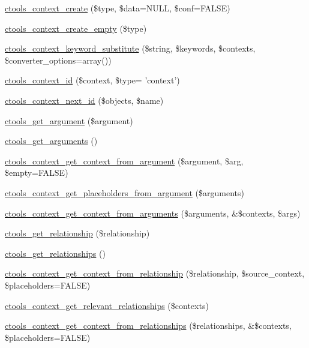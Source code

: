 \begin{DoxyCompactItemize}
\item 
\hyperlink{context_8inc_aaaf945e810dc48a1cf4643c8cb3844d9}{ctools\_\-context\_\-create} (\$type, \$data=NULL, \$conf=FALSE)
\item 
\hyperlink{context_8inc_ad8ae1df3fc34258a1b45a476782235c7}{ctools\_\-context\_\-create\_\-empty} (\$type)
\item 
\hyperlink{context_8inc_a713ff6a51980f56ba1d148ef7c3640ab}{ctools\_\-context\_\-keyword\_\-substitute} (\$string, \$keywords, \$contexts, \$converter\_\-options=array())
\item 
\hyperlink{context_8inc_aa9c13b6311b3d3a54e95a440bb3b0002}{ctools\_\-context\_\-id} (\$context, \$type= 'context')
\item 
\hyperlink{context_8inc_aa979b980941194295a45cd5000ff12ae}{ctools\_\-context\_\-next\_\-id} (\$objects, \$name)
\item 
\hyperlink{context_8inc_a008e36a5cbc918184c3227c92543cbac}{ctools\_\-get\_\-argument} (\$argument)
\item 
\hyperlink{context_8inc_afbc5e7faf33cdfa3148b17bf51934867}{ctools\_\-get\_\-arguments} ()
\item 
\hyperlink{context_8inc_a9b5a82287320cccb2cdfc67e9639ae59}{ctools\_\-context\_\-get\_\-context\_\-from\_\-argument} (\$argument, \$arg, \$empty=FALSE)
\item 
\hyperlink{context_8inc_a10a7b9e1be12405cb9de377762c7372b}{ctools\_\-context\_\-get\_\-placeholders\_\-from\_\-argument} (\$arguments)
\item 
\hyperlink{context_8inc_aebcef7cae5df2ee7b36493cce24cfd8b}{ctools\_\-context\_\-get\_\-context\_\-from\_\-arguments} (\$arguments, \&\$contexts, \$args)
\item 
\hyperlink{context_8inc_abd6deaf7e63e6d063b4cda2e0075efd7}{ctools\_\-get\_\-relationship} (\$relationship)
\item 
\hyperlink{context_8inc_a6d2449b6abd59d11ec96d325d3b1d341}{ctools\_\-get\_\-relationships} ()
\item 
\hyperlink{context_8inc_a94c40749ef39bfbb942cbca3e6c73f55}{ctools\_\-context\_\-get\_\-context\_\-from\_\-relationship} (\$relationship, \$source\_\-context, \$placeholders=FALSE)
\item 
\hyperlink{context_8inc_a3c4aa18332310a0d1d166a9f69bb80c7}{ctools\_\-context\_\-get\_\-relevant\_\-relationships} (\$contexts)
\item 
\hyperlink{context_8inc_a4cc9c61941295be0a745aa42c6188d2f}{ctools\_\-context\_\-get\_\-context\_\-from\_\-relationships} (\$relationships, \&\$contexts, \$placeholders=FALSE)

\end{DoxyCompactItemize}
